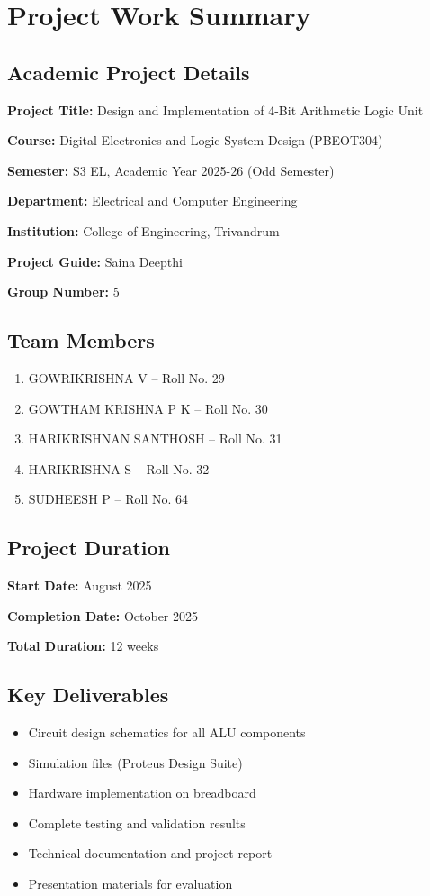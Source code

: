 \chapter*{Project Work Summary}
\thispagestyle{empty}

\section*{Academic Project Details}

\textbf{Project Title:} Design and Implementation of 4-Bit Arithmetic Logic Unit

\textbf{Course:} Digital Electronics and Logic System Design (PBEOT304)

\textbf{Semester:} S3 EL, Academic Year 2025-26 (Odd Semester)

\textbf{Department:} Electrical and Computer Engineering

\textbf{Institution:} College of Engineering, Trivandrum

\textbf{Project Guide:} Saina Deepthi

\textbf{Group Number:} 5

\section*{Team Members}

\begin{enumerate}
    \item GOWRIKRISHNA V -- Roll No. 29
    \item GOWTHAM KRISHNA P K -- Roll No. 30
    \item HARIKRISHNAN SANTHOSH -- Roll No. 31
    \item HARIKRISHNA S -- Roll No. 32
    \item SUDHEESH P -- Roll No. 64
\end{enumerate}

\section*{Project Duration}

\textbf{Start Date:} August 2025

\textbf{Completion Date:} October 2025

\textbf{Total Duration:} 12 weeks

\section*{Key Deliverables}

\begin{itemize}
    \item Circuit design schematics for all ALU components
    \item Simulation files (Proteus Design Suite)
    \item Hardware implementation on breadboard
    \item Complete testing and validation results
    \item Technical documentation and project report
    \item Presentation materials for evaluation
\end{itemize}
